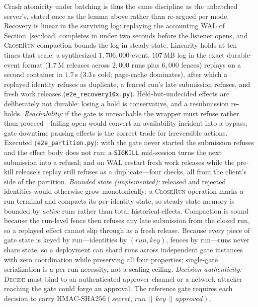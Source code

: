 \documentclass[10pt,journal,compsoc]{IEEEtran}
\begin{document}
\noindent Crash atomicity under batching is thus the same discipline as the
unbatched server's, stated once as the lemma above rather than re-argued
per mode. Recovery is linear in the surviving log: replaying the
accounting WAL of Section~\ref{sec:load} completes in under two seconds
before the listener opens, and \textsc{CloseRun} compaction bounds the log in
steady state.
Linearity holds at ten times that scale: a synthesized $1{,}706{,}000$-event,
$107$\,MB log in the exact durable-event format ($1.7$\,M releases across
$2{,}000$ runs plus $6{,}000$ fences) replays on a second container in
$1.7$\,s ($3.3$\,s cold; page-cache dominates), after which a replayed identity
refuses as duplicate, a fenced run's late submission refuses, and fresh work
releases (\texttt{e2e\_recovery10x.py}). Held-but-undecided effects are
deliberately not durable: losing a hold is conservative, and a resubmission
re-holds.
\emph{Reachability:} if the gate is unreachable the wrapper must refuse rather
than proceed---failing open would convert an availability incident into a
bypass; gate downtime pausing effects is the correct trade for irreversible
actions. Executed (\texttt{e2e\_partition.py}): with the gate never started the
submission refuses and the effect body does not run; a \texttt{SIGKILL}
mid-session turns the next submission into a refusal; and on WAL restart fresh
work releases while the pre-kill release's replay still refuses as a
duplicate---four checks, all from the client's side of the partition.
\emph{Bounded state (implemented):} released and rejected identities would
otherwise grow monotonically; a \textsc{CloseRun} operation marks a run
terminal and compacts its per-identity state, so steady-state memory is bounded
by \emph{active} runs rather than total historical effects. Compaction is
sound because the run-level fence then refuses any late submission from the
closed run, so a replayed effect cannot slip through as a fresh release.
Because every piece of gate state is keyed by run---identities by
$(\mathit{run},\mathit{key})$, fences by run---runs never share state, so a
deployment can shard runs across independent gate instances with zero
coordination while preserving all four properties; single-gate serialization
is a per-run necessity, not a scaling ceiling. \emph{Decision authenticity:}
\textsc{Decide} must bind to an authenticated approver channel or a network
attacker reaching the gate could forge an approval. The reference gate requires
each decision to carry
$\mathrm{HMAC\text{-}SHA256}(\mathit{secret},\,\mathit{run}\,\|\,\mathit{key}\,\|\,\mathit{approved})$,
\end{document}
